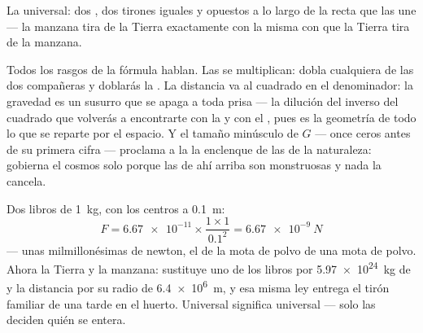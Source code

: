 \begin{omfigure}

{\small La  universal: dos , dos tirones iguales y
opuestos a lo largo de la recta que las une --- la manzana tira de la
Tierra exactamente con la misma  con que la Tierra tira de la
manzana.}
\end{omfigure}

\begin{example}\label{ex:g9:gravitation:reading}
Todos los rasgos de la fórmula hablan. Las  se multiplican: dobla
cualquiera de las dos compañeras y doblarás la . La distancia
va al cuadrado en el denominador: la gravedad es un susurro que se
apaga a toda prisa --- la dilución del inverso del cuadrado que
volverás a encontrarte con la  y con el , pues es
la geometría de todo lo que se reparte por el espacio. Y el tamaño
minúsculo de $G$ --- once ceros antes de su primera cifra --- proclama a la
 la enclenque de las  de la
naturaleza: gobierna el cosmos solo porque las  de ahí arriba son
monstruosas y nada la cancela.
\end{example}

\begin{example}\label{ex:g9:gravitation:books}
Dos libros de \qty{1}{kg}, con los centros a \qty{0.1}{m}:
\[
F = \num{6.67e-11} \times \frac{1 \times 1}{0.1^2}
= \qty{6.67e-9}{N}
\]
--- unas milmillonésimas de newton, el  de la mota de polvo de
una mota de polvo. Ahora la Tierra y la manzana: sustituye uno de los
libros por \qty{5.97e24}{kg} de  y la distancia por su radio
de \qty{6.4e6}{m}, y esa misma ley entrega el tirón familiar de una
tarde en el huerto. Universal significa universal --- solo las 
deciden quién se entera.
\end{example}

